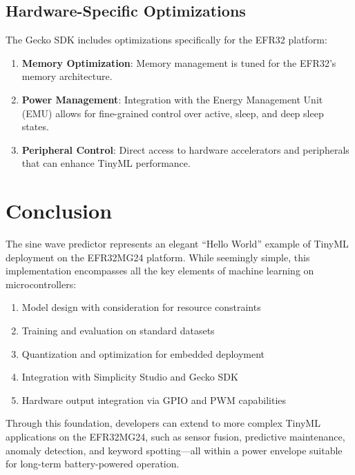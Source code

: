 \documentclass[
  9pt,
  letterpaper,
  abstract,
  titlepage]{scrbook}
\providecommand{\tightlist}{%
  \setlength{\itemsep}{0pt}\setlength{\parskip}{0pt}}\usepackage{longtable,booktabs,array}
\def\tightlist{}
\let\tightlist\relax
\begin{document}
\subsection{Hardware-Specific
Optimizations}\label{hardware-specific-optimizations}

The Gecko SDK includes optimizations specifically for the EFR32
platform:

\begin{enumerate}
\def\labelenumi{\arabic{enumi}.}
\item
  \textbf{Memory Optimization}: Memory management is tuned for the
  EFR32's memory architecture.
\item
  \textbf{Power Management}: Integration with the Energy Management Unit
  (EMU) allows for fine-grained control over active, sleep, and deep
  sleep states.
\item
  \textbf{Peripheral Control}: Direct access to hardware accelerators
  and peripherals that can enhance TinyML performance.
\end{enumerate}

\section{Conclusion}\label{conclusion-1}

The sine wave predictor represents an elegant ``Hello World'' example of
TinyML deployment on the EFR32MG24 platform. While seemingly simple,
this implementation encompasses all the key elements of machine learning
on microcontrollers:

\begin{enumerate}
\def\labelenumi{\arabic{enumi}.}
\tightlist
\item
  Model design with consideration for resource constraints
\item
  Training and evaluation on standard datasets
\item
  Quantization and optimization for embedded deployment
\item
  Integration with Simplicity Studio and Gecko SDK
\item
  Hardware output integration via GPIO and PWM capabilities
\end{enumerate}

Through this foundation, developers can extend to more complex TinyML
applications on the EFR32MG24, such as sensor fusion, predictive
maintenance, anomaly detection, and keyword spotting---all within a
power envelope suitable for long-term battery-powered operation.
\end{document}
